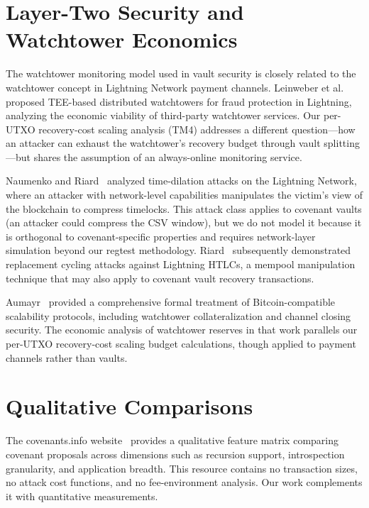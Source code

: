 \section{Layer-Two Security and Watchtower Economics} \label{se:rw_layer2}

The watchtower monitoring model used in vault security is closely related to the
watchtower concept in Lightning Network payment channels. Leinweber
et al.~\cite{LGSM19} proposed TEE-based distributed watchtowers for fraud protection
in Lightning, analyzing the economic viability of third-party watchtower services.
Our per-UTXO recovery-cost scaling analysis (TM4) addresses a different question---how an
attacker can exhaust the watchtower's recovery budget through vault
splitting---but shares the assumption of an always-online monitoring service.

Naumenko and Riard~\cite{NR21} analyzed time-dilation attacks on the Lightning
Network, where an attacker with network-level capabilities manipulates the victim's
view of the blockchain to compress timelocks. This attack class applies to covenant
vaults (an attacker could compress the CSV window), but we do not model it because
it is orthogonal to covenant-specific properties and requires network-layer
simulation beyond our regtest methodology. Riard~\cite{Ria23} subsequently
demonstrated replacement cycling attacks against Lightning HTLCs, a mempool
manipulation technique that may also apply to covenant vault recovery transactions.

Aumayr~\cite{Aumayr24} provided a comprehensive formal treatment of
Bitcoin-compatible scalability protocols, including watchtower collateralization
and channel closing security. The economic analysis of watchtower reserves in that
work parallels our per-UTXO recovery-cost scaling budget calculations, though applied to
payment channels rather than vaults.

\section{Qualitative Comparisons} \label{se:rw_qualitative}

The covenants.info website~\cite{covenants_info} provides a qualitative feature matrix
comparing covenant proposals across dimensions such as recursion support, introspection
granularity, and application breadth. This resource contains no transaction sizes, no
attack cost functions, and no fee-environment analysis. Our work complements it with
quantitative measurements.

